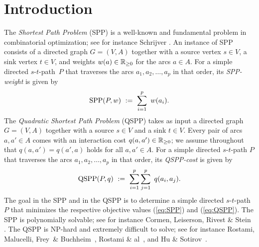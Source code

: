 \documentclass[11pt,fleqn]{article}
\begin{document}
\section{Introduction}
The \emph{Shortest Path Problem} (SPP) is a well-known and fundamental problem in 
combinatorial optimization; see for instance Schrijver \cite{Schrijver2012}.
An instance of SPP consists of a directed graph $G=(V,A)$ together with a source vertex $s\in V$, 
a sink vertex $t\in V$, and weights $w(a)\in{\mathbb{R}_{\ge0}}$ for the arcs $a\in A$.
For a simple directed $s$-$t$-path~$P$ that traverses the arcs $a_1,a_2,\ldots,a_p$ in that order,
its \emph{SPP-weight} is given by
\begin{equation}
\label{eq:SPP}
\text{SPP}(P,w) ~:=~ \sum_{i=1}^p~ w(a_i).
\end{equation}
The \emph{Quadratic Shortest Path Problem} (QSPP) takes as input a directed graph $G=(V,A)$ together
with a source $s\in V$ and a sink $t\in V$.
Every pair of arcs $a,a'\in A$ comes with an interaction cost $q(a,a')\in{\mathbb{R}_{\ge0}}$;
we assume throughout that $q(a,a')=q(a',a)$ holds for all $a,a'\in A$.
For a simple directed $s$-$t$-path $P$ that traverses the arcs $a_1,a_2,\ldots,a_p$ in that order,
its \emph{QSPP-cost} is given by 
\begin{equation}
\label{eq:QSPP}
\text{QSPP}(P,q) ~:=~ \sum_{i=1}^p\sum_{j=1}^p~ q(a_i,a_j).
\end{equation}
The goal in the SPP and in the QSPP is to determine a simple directed $s$-$t$-path $P$ that 
minimizes the respective objective values (\ref{eq:SPP}) and (\ref{eq:QSPP}).
The SPP is polynomially solvable; see for instance Cormen, Leiserson, Rivest \& Stein \cite{CLRS}.
The QSPP is NP-hard and extremely difficult to solve;
see for instance Rostami, Malucelli, Frey~\& Buchheim~\cite{Rostami-1},
Rostami \& al~\cite{Rostami-2}, and Hu \& Sotirov~\cite{HuSo2018a,HuSo2018b,HuSo2020}.
\end{document}
